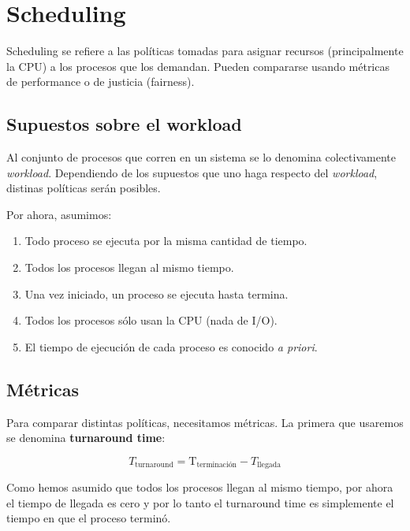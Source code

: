 \documentclass[12pt]{article}
\theoremstyle{definition}
\begin{document}
\pagebreak 


\section{Scheduling}

Scheduling se refiere a las políticas tomadas para asignar recursos
(principalmente la CPU) a los procesos que los demandan. Pueden compararse
usando métricas de performance o de justicia (fairness).

\subsection{Supuestos sobre el workload}

Al conjunto de procesos que corren en un sistema se lo denomina colectivamente
\textit{workload}. Dependiendo de los supuestos que uno haga respecto del
\textit{workload}, distinas políticas serán posibles.

Por ahora, asumimos:

\begin{enumerate}
    \item Todo proceso se ejecuta por la misma cantidad de tiempo.
    \item Todos los procesos llegan al mismo tiempo.
    \item Una vez iniciado, un proceso se ejecuta hasta termina. 
    \item Todos los procesos sólo usan la CPU (nada de I/O).
    \item El tiempo de ejecución de cada proceso es conocido \textit{a priori}.
\end{enumerate}

\subsection{Métricas}

Para comparar distintas políticas, necesitamos métricas. La primera que usaremos
se denomina \textbf{turnaround time}: 

\begin{equation*}
    T_{\text{turnaround}} = \text{T}_{\text{terminación}} - T_{\text{llegada}}
\end{equation*}

Como hemos asumido que todos los procesos llegan al mismo tiempo, por ahora el
tiempo de llegada es cero y por lo tanto el turnaround time es simplemente el
tiempo en que el proceso terminó. 
\end{document}
